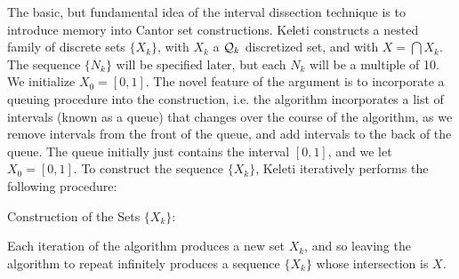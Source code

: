 
The basic, but fundamental idea of the interval dissection technique is to introduce memory into Cantor set constructions. Keleti constructs a nested family of discrete sets $\{ X_k \}$, with $X_k$ a $\operatorname{\mathcal{Q}}_k$ discretized set, and with $X = \bigcap X_k$. The sequence $\{ N_k \}$ will be specified later, but each $N_k$ will be a multiple of 10. We initialize $X_0 = [0,1]$. The novel feature of the argument is to incorporate a queuing procedure into the construction, i.e. the algorithm incorporates a list of intervals (known as a queue) that changes over the course of the algorithm, as we remove intervals from the front of the queue, and add intervals to the back of the queue. The queue initially just contains the interval $[0,1]$, and we let $X_0 = [0,1]$. To construct the sequence $\{ X_k \}$, Keleti iteratively performs the following procedure:
%
\begin{algorithm}[H]
    \begin{algorithmic}%
        \caption{Construction of the Sets $\{ X_k \}$:}
        \MRepeat


            \EndForAll
        \EndRepeat   
    \end{algorithmic}
\end{algorithm}

Each iteration of the algorithm produces a new set $X_k$, and so leaving the algorithm to repeat infinitely produces a sequence $\{ X_k \}$ whose intersection is $X$.

